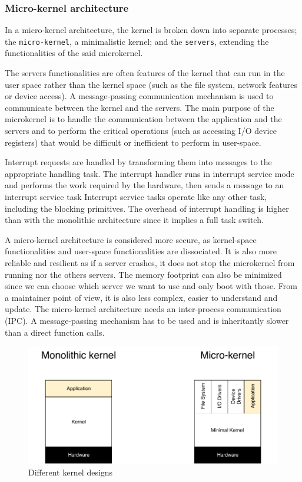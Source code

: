 \subsubsection{Micro-kernel architecture}
In a micro-kernel architecture, the kernel is broken down into separate processes;
     the \texttt{micro-kernel}, a minimalistic kernel;
     and the \texttt{servers}, extending the functionalities of the said microkernel.

The servers functionalities are often features of the kernel that can run in the user space
    rather than the kernel space (such as the file system, network features or device access).
A message-passing communication mechanism is used to communicate between the kernel and the servers.
The main purpose of the microkernel is to handle the communication between the application and the servers
    and to perform the critical operations (such as accessing I/O device registers) that would be difficult or inefficient to perform in user-space.

Interrupt requests are handled by transforming them into messages to the appropriate handling task.
The interrupt handler runs in interrupt service mode and performs the work required by the hardware, then sends a message to an interrupt service task
Interrupt service tasks operate like any other task, including the blocking primitives.
The overhead of interrupt handling is higher than with the monolithic architecture since it implies a full task switch.

A micro-kernel architecture is considered more secure, as kernel-space functionalities and user-space functionalities are dissociated.
It is also more reliable and resilient as if a server crashes, it does not stop the microkernel from running nor the others servers.
The memory footprint can also be minimized since we can choose which server we want to use and only boot with those.
From a maintainer point of view, it is also less complex, easier to understand and update.
The micro-kernel architecture needs an inter-process communication (IPC).
A message-passing mechanism has to be used and is inheritantly slower than a direct function calls.
\\

\begin{figure}[!h]
    \centering
    \includegraphics[scale=0.7]{assets/kernel_types.pdf}
    \caption{\label{fig:kernel-types}Different kernel designs}
\end{figure}

